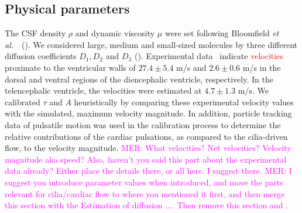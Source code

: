 \documentclass[fleqn]{wlscirep}
\newcommand{\mer}[1]{\textcolor{magenta}{#1}}
\newcommand{\fixme}[1]{\textcolor{red}{#1}}
\begin{document}
\subsection*{Physical parameters}
The CSF density $\rho$ and dynamic viscosity $\mu$ were set following Bloomfield \textit{et al.}~\cite{Bloomfield1998EffectsFluid}~(). We considered large, medium and small-sized molecules by three different diffusion coefficients $D_1, D_2$ and $D_3$ (). Experimental data~\cite{Olstad2019CiliaryDevelopment} indicate \fixme{velocities} proximate to the ventricular walls of $27.4 \pm 5.4$ \textmu m/s and $2.6 \pm 0.6$ \textmu m/s in the dorsal and ventral regions of the diencephalic ventricle, respectively. In the telencephalic ventricle, the velocities were estimated at $4.7 \pm 1.3$ \textmu m/s. We calibrated $\tau$ and $A$ heuristically by comparing these experimental velocity values with the simulated, maximum velocity magnitude. In addition, particle tracking data of pulsatile motion was used in the calibration process to determine the relative contributions of the cardiac pulsations, as compared to the cilia-driven flow, to the velocity magnitude.
\mer{MER: What velocities? Net velocities? Velocity magnitude aka speed? Also, haven't you said this part about the experimental data already? Either place the details there, or all here. I suggest there.}
\mer{MER: I suggest you introduce parameter values when introduced, and move the parts relevant for cilia/cardiac flow to where you mentioned it first, and then merge this section with the Estimation of diffusion .... Then remove this section and \Cref{tab:parameter_table}.}
\end{document}
